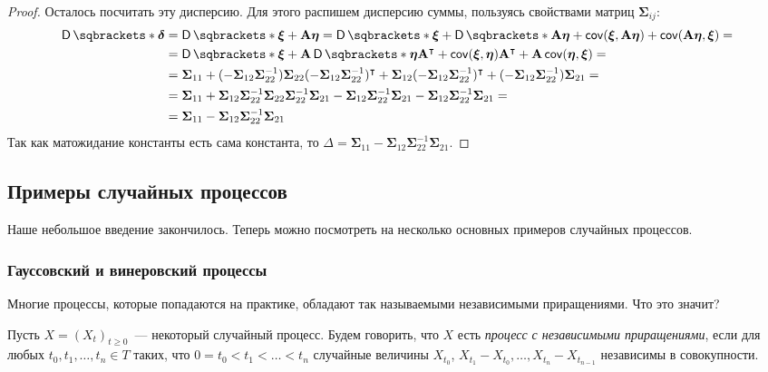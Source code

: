 \begin{proof}
	Осталось посчитать эту дисперсию. Для этого распишем дисперсию суммы, 
	пользуясь свойствами матриц \(\bm{\Sigma}_{ij}\):
	\begin{align*}
		\D{\bm{\delta}} &= \D{\bm{\xi} + \mathbf{A}\bm{\eta}} = \D{\bm{\xi}} + 
		\D{\mathbf{A}\bm{\eta}} + \cov(\bm{\xi}, \mathbf{A}\bm{\eta}) + 
		\cov(\mathbf{A}\bm{\eta}, \bm{\xi}) = \\
		&= \D{\bm{\xi}} + \mathbf{A}\D{\bm{\eta}}\mathbf{A}^{\intercal} + 
		\cov(\bm{\xi}, \bm{\eta})\mathbf{A}^{\intercal} + 
		\mathbf{A}\cov(\bm{\eta}, \bm{\xi}) = \\
		&= \bm{\Sigma}_{11} + (-\bm{\Sigma}_{12}\bm{\Sigma}_{22}^{-1}) 
		\bm{\Sigma}_{22}(-\bm{\Sigma}_{12}\bm{\Sigma}_{22}^{-1})^{\intercal} + 
		\bm{\Sigma}_{12}(-\bm{\Sigma}_{12}\bm{\Sigma}_{22}^{-1})^{\intercal} + 
		(-\bm{\Sigma}_{12}\bm{\Sigma}_{22}^{-1})\bm{\Sigma}_{21} = \\
		&= \bm{\Sigma}_{11} + \bm{\Sigma}_{12}\bm{\Sigma}_{22}^{-1}
		\bm{\Sigma}_{22} \bm{\Sigma}_{22}^{-1}\bm{\Sigma}_{21} - 
		\bm{\Sigma}_{12}\bm{\Sigma}_{22}^{-1}\bm{\Sigma}_{21} - 
		\bm{\Sigma}_{12}\bm{\Sigma}_{22}^{-1}\bm{\Sigma}_{21} = \\
		&= \bm{\Sigma}_{11} - 
		\bm{\Sigma}_{12}\bm{\Sigma}_{22}^{-1}\bm{\Sigma}_{21}
	\end{align*}
	Так как матожидание константы есть сама константа, то \(\Delta = 
	\bm{\Sigma}_{11} - \bm{\Sigma}_{12}\bm{\Sigma}_{22}^{-1}\bm{\Sigma}_{21}\).
\end{proof}

\subsection{Примеры случайных процессов}
Наше небольшое введение закончилось. Теперь можно посмотреть на несколько 
основных примеров случайных процессов.
\subsubsection{Гауссовский и винеровский процессы}
Многие процессы, которые попадаются на практике, обладают так называемыми 
независимыми приращениями. Что это значит?
\begin{definition}
	Пусть \(X = (X_{t})_{t \geq 0}\)~--- некоторый случайный процесс. Будем 
	говорить, что \(X\) есть \emph{процесс с независимыми приращениями}, если 
	для любых \(t_{0}, t_{1}, \dots, t_{n} \in T\) таких, что \(0 = t_{0} < 
	t_{1} < \ldots < t_{n}\) случайные величины \(X_{t_{0}}\), \(X_{t_{1}} - 
	X_{t_{0}}, \dots, X_{t_{n}} - X_{t_{n - 1}}\) независимы в 
	совокупности.
\end{definition}

